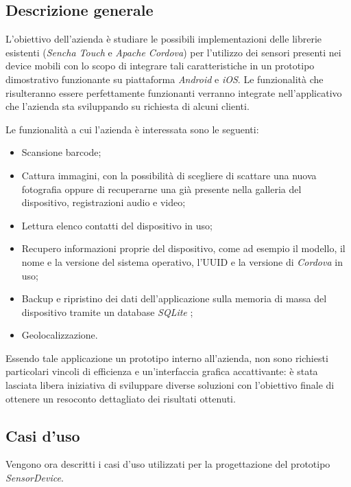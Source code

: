\subsection{Descrizione generale}
L'obiettivo dell'azienda è studiare le possibili implementazioni delle librerie esistenti (\emph{Sencha Touch} e \emph{Apache Cordova}) per l'utilizzo dei sensori presenti nei device mobili con lo scopo di integrare tali caratteristiche in un prototipo dimostrativo funzionante su piattaforma \emph{Android} e \emph{iOS}.
Le funzionalità che risulteranno essere perfettamente funzionanti verranno integrate nell'applicativo che l'azienda sta sviluppando su richiesta di alcuni clienti.

Le funzionalità a cui l'azienda è interessata sono le seguenti:
\begin{itemize}
\item Scansione barcode;
\item Cattura immagini, con la possibilità di scegliere di scattare una nuova fotografia oppure di recuperarne una già presente nella galleria del dispositivo, registrazioni audio e video;
\item Lettura elenco contatti del dispositivo in uso;
\item Recupero informazioni proprie del dispositivo, come ad esempio il modello, il nome e la versione del sistema operativo, l'\ac{UUID} e la versione di \emph{Cordova} in uso;
\item Backup e ripristino dei dati dell'applicazione sulla memoria di massa del dispositivo tramite un database \emph{SQLite} \cite{hipp:sqlite};
\item Geolocalizzazione.
\end{itemize}

Essendo tale applicazione un prototipo interno all'azienda, non sono richiesti particolari vincoli di efficienza e un'interfaccia grafica accattivante: è stata lasciata libera iniziativa di sviluppare diverse soluzioni con l'obiettivo finale di ottenere un resoconto dettagliato dei risultati ottenuti.

\subsection{Casi d'uso}
Vengono ora descritti i casi d'uso utilizzati per la progettazione del prototipo \emph{SensorDevice}.

